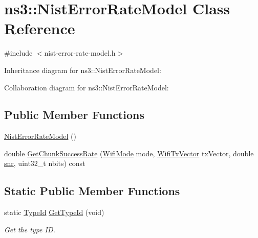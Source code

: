 \hypertarget{classns3_1_1NistErrorRateModel}{}\section{ns3\+:\+:Nist\+Error\+Rate\+Model Class Reference}
\label{classns3_1_1NistErrorRateModel}


{\ttfamily \#include $<$nist-\/error-\/rate-\/model.\+h$>$}



Inheritance diagram for ns3\+:\+:Nist\+Error\+Rate\+Model\+:


Collaboration diagram for ns3\+:\+:Nist\+Error\+Rate\+Model\+:
\subsection*{Public Member Functions}
\begin{DoxyCompactItemize}
\item 
\hyperlink{classns3_1_1NistErrorRateModel_abb5e039d96726e3e2dd7b77d58736810}{Nist\+Error\+Rate\+Model} ()
\item 
double \hyperlink{classns3_1_1NistErrorRateModel_a2316a2c287485d7cc81198c90b246bc0}{Get\+Chunk\+Success\+Rate} (\hyperlink{classns3_1_1WifiMode}{Wifi\+Mode} mode, \hyperlink{classns3_1_1WifiTxVector}{Wifi\+Tx\+Vector} tx\+Vector, double \hyperlink{lte__pathloss_8m_ae6e82a215dff6b79fb6e9952a1b78453}{snr}, uint32\+\_\+t nbits) const 
\end{DoxyCompactItemize}
\subsection*{Static Public Member Functions}
\begin{DoxyCompactItemize}
\item 
static \hyperlink{classns3_1_1TypeId}{Type\+Id} \hyperlink{classns3_1_1NistErrorRateModel_a7cd2230fbc40bdb5ce6e28a65ea1aa24}{Get\+Type\+Id} (void)
\begin{DoxyCompactList}\small\item\em Get the type ID. \end{DoxyCompactList}\end{DoxyCompactItemize}
